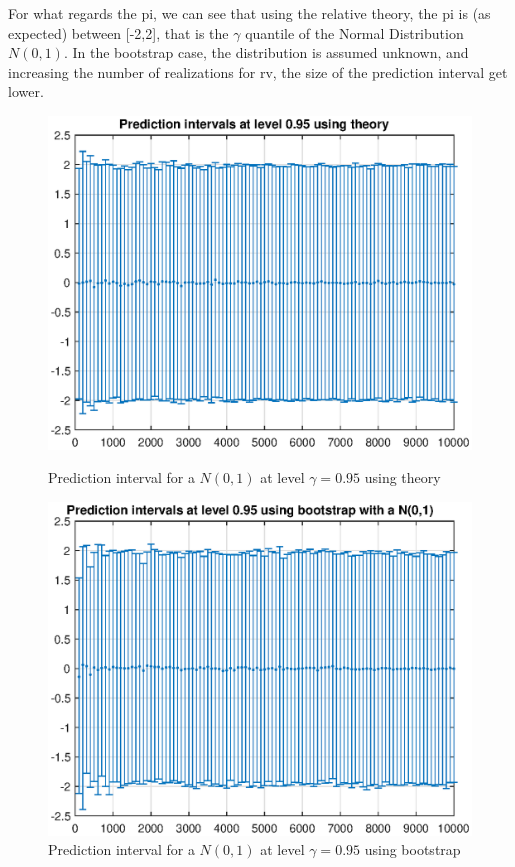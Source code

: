 \documentclass[11pt,a4paper]{article}
\begin{document}
For what regards the \gls{pi}, we can see that using the relative theory, the \gls{pi} is (as expected) between [-2,2], that is the $\gamma$ quantile of the Normal Distribution $N(0,1)$. In the bootstrap case, the distribution is assumed unknown, and increasing the number of realizations for rv, the size of the prediction interval get lower.

\begin{figure}[ht]
	\centering
	\begin{minipage}{0.45\textwidth}
		\centering
		\includegraphics[width=\textwidth]{PI_theory_N}
		\caption{Prediction interval for a $N(0,1)$ at level $\gamma = 0.95$ using theory}
		\label{fig:PI_theory_N}
	\end{minipage}
	\begin{minipage}{0.45\textwidth}
		\centering
		\includegraphics[width=\textwidth]{PI_bootstrap_N}
		\caption{Prediction interval for a $N(0,1)$ at level $\gamma = 0.95$ using bootstrap}
		\label{fig:PI_bootstrap_N}
	\end{minipage}
\end{figure}
\end{document}
